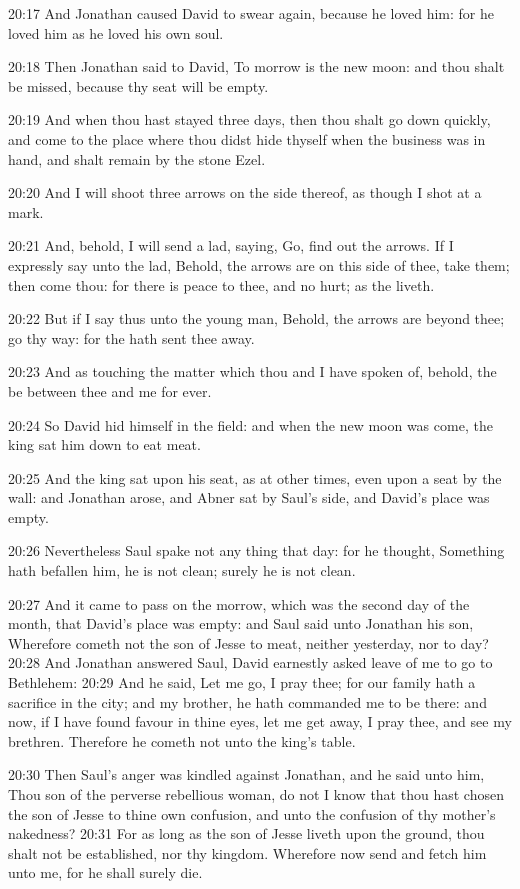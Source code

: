 20:17 And Jonathan caused David to swear again, because he loved him:
for he loved him as he loved his own soul.

20:18 Then Jonathan said to David, To morrow is the new moon: and thou
shalt be missed, because thy seat will be empty.

20:19 And when thou hast stayed three days, then thou shalt go down
quickly, and come to the place where thou didst hide thyself when the
business was in hand, and shalt remain by the stone Ezel.

20:20 And I will shoot three arrows on the side thereof, as though I
shot at a mark.

20:21 And, behold, I will send a lad, saying, Go, find out the arrows.
If I expressly say unto the lad, Behold, the arrows are on this side
of thee, take them; then come thou: for there is peace to thee, and no
hurt; as the \LORD liveth.

20:22 But if I say thus unto the young man, Behold, the arrows are
beyond thee; go thy way: for the \LORD hath sent thee away.

20:23 And as touching the matter which thou and I have spoken of,
behold, the \LORD be between thee and me for ever.

20:24 So David hid himself in the field: and when the new moon was
come, the king sat him down to eat meat.

20:25 And the king sat upon his seat, as at other times, even upon a
seat by the wall: and Jonathan arose, and Abner sat by Saul's side,
and David's place was empty.

20:26 Nevertheless Saul spake not any thing that day: for he thought,
Something hath befallen him, he is not clean; surely he is not clean.

20:27 And it came to pass on the morrow, which was the second day of
the month, that David's place was empty: and Saul said unto Jonathan
his son, Wherefore cometh not the son of Jesse to meat, neither
yesterday, nor to day?  20:28 And Jonathan answered Saul, David
earnestly asked leave of me to go to Bethlehem: 20:29 And he said, Let
me go, I pray thee; for our family hath a sacrifice in the city; and
my brother, he hath commanded me to be there: and now, if I have found
favour in thine eyes, let me get away, I pray thee, and see my
brethren. Therefore he cometh not unto the king's table.

20:30 Then Saul's anger was kindled against Jonathan, and he said unto
him, Thou son of the perverse rebellious woman, do not I know that
thou hast chosen the son of Jesse to thine own confusion, and unto the
confusion of thy mother's nakedness?  20:31 For as long as the son of
Jesse liveth upon the ground, thou shalt not be established, nor thy
kingdom. Wherefore now send and fetch him unto me, for he shall surely
die.

